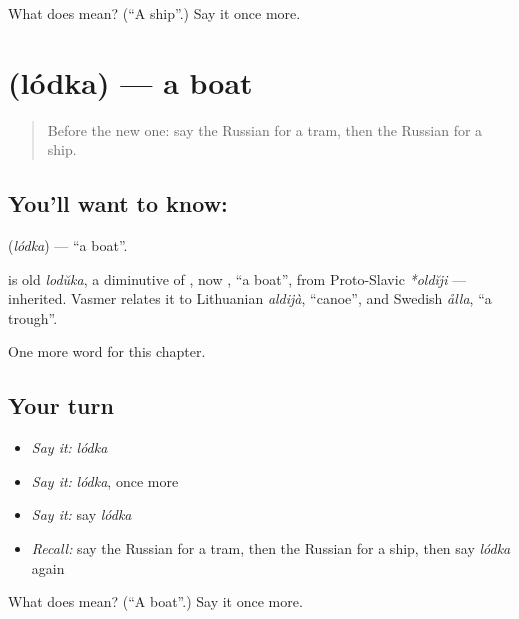 \begin{tcolorbox}[breakable,colback=teal!4,colframe=teal!35!black,title={Before you move on}]
What does  mean? (\textquotedblleft{}A ship\textquotedblright{}.) Say it once more.
\end{tcolorbox}
\section[\texorpdfstring{\ru{лодка} (lódka)}{лодка (lódka)}]{ (lódka) — a boat}

\label{lesson:RU-C91-boat}



\begin{quote}
Before the new one: say the Russian for a tram, then the Russian for a ship.
\end{quote}

\subsection*{You'll want to know: }
\textbf{} (\emph{lódka}) — \textquotedblleft{}a boat\textquotedblright{}.

\begin{cousinweb}
\textbf{} is old \emph{lodŭka}, a diminutive of \emph{}, now \emph{}, \textquotedblleft{}a boat\textquotedblright{}, from Proto-Slavic \emph{*oldĭji} — inherited. Vasmer relates it to Lithuanian \emph{aldijà}, \textquotedblleft{}canoe\textquotedblright{}, and Swedish \emph{ålla}, \textquotedblleft{}a trough\textquotedblright{}.
\end{cousinweb}

\begin{grammarlens}[title={What you've built}]
One more word for this chapter.
\end{grammarlens}

\subsection*{Your turn}
\begin{itemize}
\raggedright
  \item \emph{Say it:} \emph{lódka}
  \item \emph{Say it:} \emph{lódka}, once more
  \item \emph{Say it:} say \emph{lódka}
  \item \emph{Recall:} say the Russian for a tram, then the Russian for a ship, then say \emph{lódka} again
\end{itemize}

\begin{tcolorbox}[breakable,colback=teal!4,colframe=teal!35!black,title={Before you move on}]
What does  mean? (\textquotedblleft{}A boat\textquotedblright{}.) Say it once more.
\end{tcolorbox}

